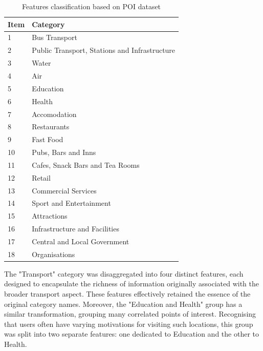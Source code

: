 \begin{table}[H]
\centering
\begin{tabular}{@{}ll@{}}
\toprule
\textbf{Item} & \textbf{Category}                             \\ \midrule
1             & Bus Transport                                 \\
2             & Public Transport, Stations and Infrastructure \\
3             & Water                                         \\
4             & Air                                           \\
5             & Education                                     \\
6             & Health                                        \\
7             & Accomodation                                  \\
8             & Restaurants                                   \\
9             & Fast Food                                     \\
10            & Pubs, Bars and Inns                           \\
11            & Cafes, Snack Bars and Tea Rooms               \\
12            & Retail                                        \\
13            & Commercial Services                           \\
14            & Sport and Entertainment                       \\
15            & Attractions                                    \\
16            & Infrastructure and Facilities                 \\
17            & Central and Local Government                  \\
18            & Organisations                                 \\ \bottomrule
\end{tabular}
    \caption{Features classification based on POI dataset}
    \label{table: class_POIs}
\end{table}

        The "Transport" category was disaggregated into four distinct features, each designed to encapsulate the richness of information originally associated with the broader transport aspect. These features effectively retained the essence of the original category names. Moreover, the "Education and Health" group has a similar transformation, grouping many correlated points of interest. Recognising that users often have varying motivations for visiting such locations, this group was split into two separate features: one dedicated to Education and the other to Health.
        
